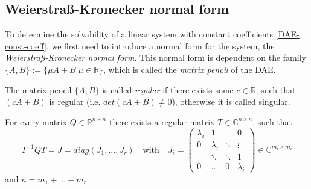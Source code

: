 \subsection{Weierstraß-Kronecker normal form}
\label{chap:Weierstraß-Kronecker Normalform}

To determine the solvability of a linear system with constant coefficients \eqref{DAE-const-coeff}, we first need to introduce a normal form for the system, the \emph{Weierstraß-Kronecker normal form}. This normal form is dependent on the family $\{A,B\} := \{ \mu A+B|\mu \in \mathbb{R} \}$, which is called the  \emph{matrix pencil} of the DAE.

\begin{definition}
	The matrix pencil $\{ A,B\}$ is called \emph{regular} if there exists some $c \in \mathbb{R}$, such that $(cA+B)$ is regular (i.e. $det(cA+B) \neq 0$), otherwise it is called singular.
\end{definition}

\begin{theorem}
	For every matrix $Q \in \mathbb{R}^{n \times n}$ there exists a regular matrix $T \in \mathbb{C}^{n \times n}$, such that
	\begin{displaymath}
		T^{-1}QT = J = diag(J_1, ..., J_r) \quad \text{with} \quad J_i = 
		\left(
		\begin{matrix}
			\lambda_i & 1 & & 0 \\
			0 & \lambda_i & \ddots & \vdots \\
			& \ddots & \ddots & 1 \\
			0 & \hdots & 0 & \lambda_i
		\end{matrix}
		\right)
		\in \mathbb{C}^{m_i \times m_i}
	\end{displaymath} 
	and $n = m_1 + ... + m_r$.
\end{theorem}

